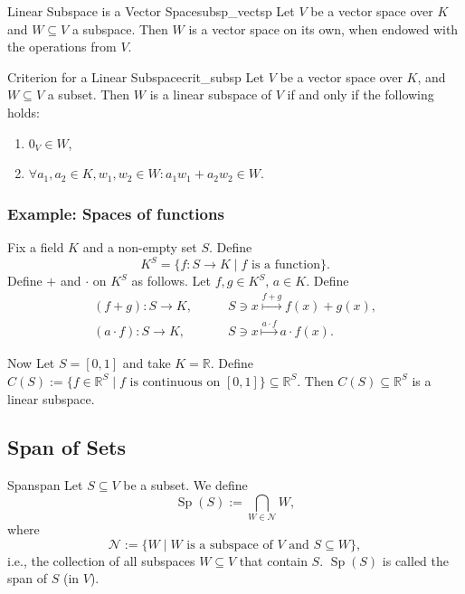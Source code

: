 \begin{lemma}{Linear Subspace is a Vector Space}{subsp_vectsp}
	Let $V$ be a vector space over $K$ and $W \subseteq V$ a subspace. Then $W$ is a vector space on its own, when endowed with the operations from $V$.
\end{lemma}

\begin{lemma}{Criterion for a Linear Subspace}{crit_subsp}
	Let $V$ be a vector space over $K$, and $W  \subseteq V$ a subset. Then $W$ is a linear subspace of $V$ if and only if the following holds:
	\begin{enumerate}
		\item[(1)] $0_V \in W$,
		\item[(2)] $\forall a_1, a_2 \in K, w_1, w_2 \in W : a_1 w_1 + a_2 w_2 \in W$.
	\end{enumerate}
\end{lemma}

\subsubsection*{Example: Spaces of functions}
Fix a field $K$ and a non-empty set $S$. Define
\[
	K^S = \{f:S \to K \;|\; f \text{ is a function}\}.
\]
Define $+$ and $\cdot$ on $K^S$ as follows. Let $f,g \in K^S$, $a \in K$. Define
\begin{align*}
	(f+g):S \to K,& \qquad S \owns x \overset{f+g}{\longmapsto} f(x) + g(x),\\
	(a \cdot f): S \to K,& \qquad S \owns x \overset{a\cdot f}{\longmapsto} a\cdot f(x).
\end{align*}

Now Let $S = [0, 1]$ and take $K = \mathbb{R}$. Define $C(S) := \{f \in \mathbb{R}^S \;|\; f \text{ is continuous on }[0,1]\} \subseteq \mathbb{R}^S$.
Then $C(S) \subseteq \mathbb{R}^S$ is a linear subspace.

\subsection{Span of Sets}

\begin{definition}{Span}{span}
	Let $S \subseteq V$ be a subset. We define
	\[
		\operatorname{Sp}(S) := \bigcap_{W \in \mathcal{N}} W,
	\]
	where
	\[
		\mathcal{N} := \{W \;|\; W \text{ is a subspace of } V \text{ and } S \subseteq W\},
	\]
	i.e., the collection of all subspaces $W \subseteq V$ that contain $S$.
	$\operatorname{Sp}(S)$ is called the span of $S$ (in $V$).
\end{definition}

